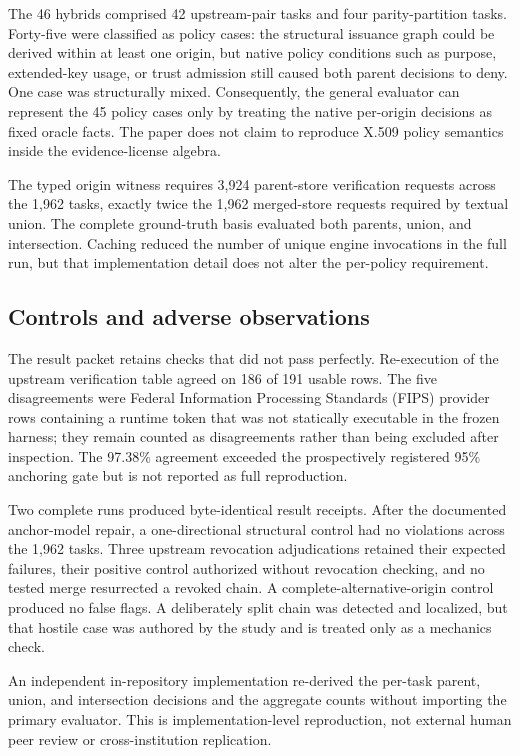\documentclass[pdflatex,sn-mathphys-num]{sn-jnl}
\begin{document}
The 46 hybrids comprised 42 upstream-pair tasks and four parity-partition tasks. Forty-five were classified as policy cases: the structural issuance graph could be derived within at least one origin, but native policy conditions such as purpose, extended-key usage, or trust admission still caused both parent decisions to deny. One case was structurally mixed. Consequently, the general evaluator can represent the 45 policy cases only by treating the native per-origin decisions as fixed oracle facts. The paper does not claim to reproduce X.509 policy semantics inside the evidence-license algebra.

The typed origin witness requires 3,924 parent-store verification requests across the 1,962 tasks, exactly twice the 1,962 merged-store requests required by textual union. The complete ground-truth basis evaluated both parents, union, and intersection. Caching reduced the number of unique engine invocations in the full run, but that implementation detail does not alter the per-policy requirement.

\subsection{Controls and adverse observations}\label{controls-and-adverse-observations}

The result packet retains checks that did not pass perfectly. Re-execution of the upstream verification table agreed on 186 of 191 usable rows. The five disagreements were Federal Information Processing Standards (FIPS) provider rows containing a runtime token that was not statically executable in the frozen harness; they remain counted as disagreements rather than being excluded after inspection. The 97.38\% agreement exceeded the prospectively registered 95\% anchoring gate but is not reported as full reproduction.

Two complete runs produced byte-identical result receipts. After the documented anchor-model repair, a one-directional structural control had no violations across the 1,962 tasks. Three upstream revocation adjudications retained their expected failures, their positive control authorized without revocation checking, and no tested merge resurrected a revoked chain. A complete-alternative-origin control produced no false flags. A deliberately split chain was detected and localized, but that hostile case was authored by the study and is treated only as a mechanics check.

An independent in-repository implementation re-derived the per-task parent, union, and intersection decisions and the aggregate counts without importing the primary evaluator. This is implementation-level reproduction, not external human peer review or cross-institution replication.
\end{document}
